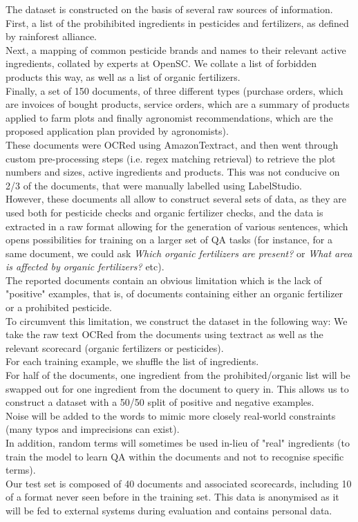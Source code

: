 \documentclass[11pt]{article}
\begin{document}
The dataset is constructed on the basis of several raw sources of information.
First, a list of the probihibited ingredients in pesticides and fertilizers, as defined by rainforest alliance. \\
Next, a mapping of common pesticide brands and names to their relevant active ingredients, collated by experts at OpenSC. We collate a list of forbidden products this way, as well as a list of organic fertilizers.  \\
Finally, a set of 150 documents, of three different types (purchase orders, which are invoices of bought products, service orders, which are a summary of products applied to farm plots and finally agronomist recommendations, which are the proposed application plan provided by agronomists).\\
These documents were OCRed using AmazonTextract, and then 
went through custom pre-processing steps (i.e. regex matching retrieval) to retrieve the plot numbers and sizes, active ingredients and products. This was not conducive on 2/3 of the documents, that were manually labelled using LabelStudio. \\
However, these documents all allow to construct several sets of data, as they are used both for pesticide checks and organic fertilizer checks, and the data is extracted in a raw format allowing for the generation of various sentences, which opens possibilities for training on a larger set of QA tasks (for instance, for a same document, we could ask \textit{Which organic fertilizers are present?} or \textit{What area is affected by organic fertilizers?} etc).\\
The reported documents contain an obvious limitation which is the lack of "positive" examples, that is, of documents containing either an organic fertilizer or a prohibited pesticide. \\
To circumvent this limitation, we construct the dataset in the following way:
We take the raw text OCRed from the documents using textract as well as the relevant scorecard (organic fertilizers or pesticides). \\
For each training example, we shuffle the list of ingredients. \\
For half of the documents, one ingredient from the prohibited/organic list will be swapped out for one ingredient from  the document to query in. This allows us to construct a dataset with a 50/50 split of positive and negative examples. \\
Noise will be added to the words to mimic more closely real-world constraints (many typos and imprecisions can exist). \\
In addition, random terms will sometimes be used in-lieu of "real" ingredients (to train the model to learn QA within the documents and not to recognise specific terms). \\
Our test set is composed of 40 documents and associated scorecards, including 10 of a format never seen before in the training set. This data is 
anonymised as it will be fed to external systems during evaluation and contains personal data.
\end{document}
